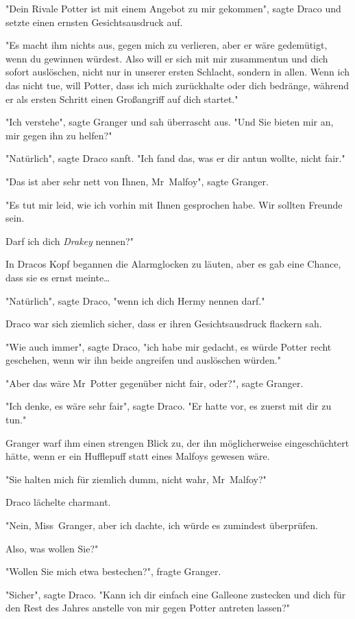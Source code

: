 {"Dein Rivale Potter ist mit einem Angebot zu mir gekommen", sagte Draco und setzte einen ernsten Gesichtsausdruck auf.

"Es macht ihm nichts aus, gegen mich zu verlieren, aber er wäre gedemütigt, wenn du gewinnen würdest. Also will er sich mit mir zusammentun und dich sofort auslöschen, nicht nur in unserer ersten Schlacht, sondern in allen. Wenn ich das nicht tue, will Potter, dass ich mich zurückhalte oder dich bedränge, während er als ersten Schritt einen Großangriff auf dich startet."

"Ich verstehe", sagte Granger und sah überrascht aus. "Und Sie bieten mir an, mir gegen ihn zu helfen?"

"Natürlich", sagte Draco sanft. "Ich fand das, was er dir antun wollte, nicht fair."

"Das ist aber sehr nett von Ihnen, Mr~Malfoy", sagte Granger.

"Es tut mir leid, wie ich vorhin mit Ihnen gesprochen habe. Wir sollten Freunde sein.

Darf ich dich \emph{Drakey} nennen?"

In Dracos Kopf begannen die Alarmglocken zu läuten, aber es gab eine Chance, dass sie es ernst meinte…

"Natürlich", sagte Draco, "wenn ich dich Hermy nennen darf."

Draco war sich ziemlich sicher, dass er ihren Gesichtsausdruck flackern sah.

"Wie auch immer", sagte Draco, "ich habe mir gedacht, es würde Potter recht geschehen, wenn wir ihn beide angreifen und auslöschen würden."

"Aber das wäre Mr~Potter gegenüber nicht fair, oder?", sagte Granger.

"Ich denke, es wäre sehr fair", sagte Draco. "Er hatte vor, es zuerst mit dir zu tun."

Granger warf ihm einen strengen Blick zu, der ihn möglicherweise eingeschüchtert hätte, wenn er ein Hufflepuff statt eines Malfoys gewesen wäre.

"Sie halten mich für ziemlich dumm, nicht wahr, Mr~Malfoy?"

Draco lächelte charmant.

"Nein, Miss~Granger, aber ich dachte, ich würde es zumindest überprüfen.

Also, was wollen Sie?"

"Wollen Sie mich etwa bestechen?", fragte Granger.

"Sicher", sagte Draco. "Kann ich dir einfach eine Galleone zustecken und dich für den Rest des Jahres anstelle von mir gegen Potter antreten lassen?"

}
